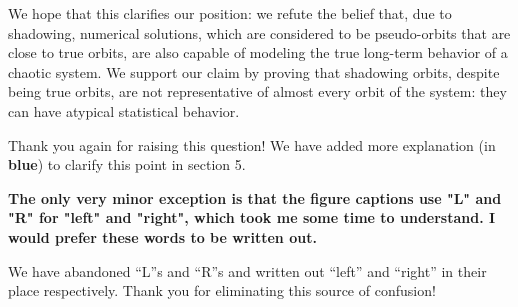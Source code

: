 \documentclass[11pt]{article}
\newcommand{\reviewerTwo}[1]{{\color{azure}\textbf{#1}}}
\begin{document}
We hope that this clarifies our position: we refute the belief that, due to shadowing, numerical solutions, which are considered to be pseudo-orbits that are close to true orbits, are also capable of modeling the true long-term behavior of a chaotic system. We support our claim by proving that shadowing orbits, despite being true orbits, are not representative of almost every orbit of the system: they can have atypical statistical behavior. 

Thank you again for raising this question! We have added more explanation (in \reviewerTwo{blue}) to clarify this point in section 5.
\vspace{0.2in}

\reviewerTwo{The only very minor exception is that the figure captions use "L" and "R" for "left" and "right", which took me some time to understand. I would prefer these words to be written out.
}

We have abandoned ``L''s and ``R''s and written out ``left'' and ``right'' in their place respectively. Thank you for eliminating this source of confusion! 
\end{document}
